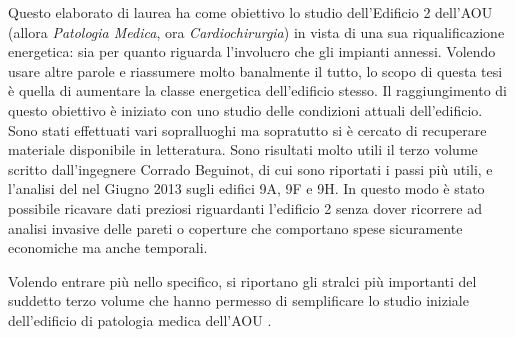 Questo elaborato di laurea ha come obiettivo lo studio dell'Edificio 2 dell'AOU \uni{} (allora \emph{Patologia Medica}, ora \emph{Cardiochirurgia}) in vista di una sua riqualificazione energetica: sia per quanto riguarda l'involucro che gli impianti annessi. Volendo usare altre parole e riassumere molto banalmente il tutto, lo scopo di questa tesi è quella di aumentare la classe energetica dell'edificio stesso. Il raggiungimento di questo obiettivo è iniziato con uno studio delle condizioni attuali dell'edificio. Sono stati effettuati vari sopralluoghi ma sopratutto si è cercato di recuperare materiale disponibile in letteratura. Sono risultati molto utili il terzo volume scritto dall'ingegnere Corrado Beguinot, di cui sono riportati i passi più utili, e l'analisi del  nel Giugno 2013 sugli edifici 9A, 9F e 9H. In questo modo è stato possibile ricavare dati preziosi riguardanti l'edificio 2 senza dover ricorrere ad analisi invasive delle pareti o coperture che comportano spese sicuramente economiche ma anche temporali.

Volendo entrare più nello specifico, si riportano gli stralci più importanti del suddetto terzo volume che hanno permesso di semplificare lo studio iniziale dell'edificio di patologia medica dell'AOU \uni. 

